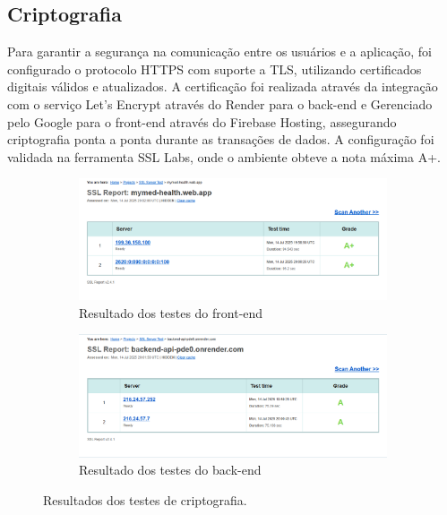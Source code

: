 \documentclass[
	article,			%
	12pt,				%
	oneside,			%
	a4paper,			%
    BIBLATEX,           %
	english,			%
	brazil,				%
	sumario=tradicional
	]{abntex2}
\begin{document}
\subsection{Criptografia}

Para garantir a segurança na comunicação entre os usuários e a aplicação, foi configurado o protocolo HTTPS com suporte a TLS, utilizando certificados digitais válidos e atualizados. A certificação foi realizada através da integração com o serviço Let's Encrypt através do Render para o back-end e Gerenciado pelo Google para o front-end através do Firebase Hosting, assegurando criptografia ponta a ponta durante as transações de dados. A configuração foi validada na ferramenta SSL Labs, onde o ambiente obteve a nota máxima A+.

\begin{figure}[h!]
    \centering
    \begin{subfigure}[b]{0.45\textwidth}
        \centering
        \includegraphics[width=\textwidth]{Figuras/certificacao_front.png}
        \caption{Resultado dos testes do front-end}
    \end{subfigure}
    \hfill
    \begin{subfigure}[b]{0.45\textwidth}
        \centering
        \includegraphics[width=\textwidth]{Figuras/certificacao_back.png}
        \caption{Resultado dos testes do back-end}
    \end{subfigure}
    \label{fig:testes-criptografia}
    \caption{Resultados dos testes de criptografia.}
\end{figure}
\end{document}
